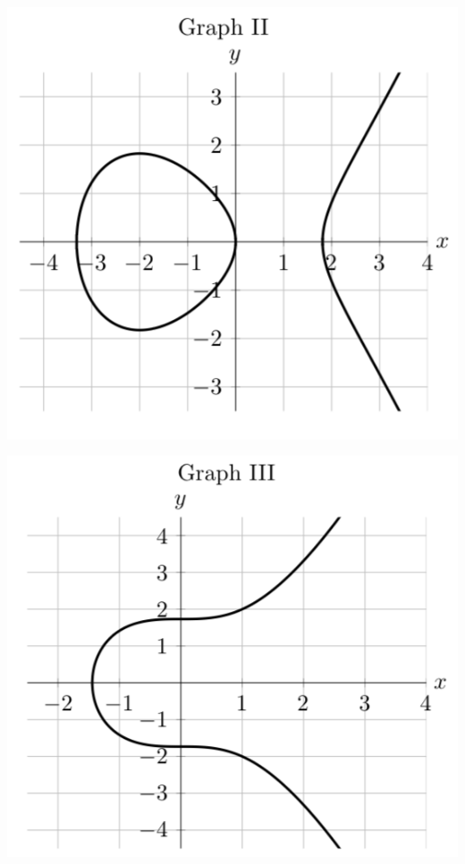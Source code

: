\documentclass[11pt]{exam}
\begin{document}
\begin{questions}
\begin{multicols}{3}
\begin{center}
  \end{center}
  \begin{center}
    \includegraphics[scale=0.3]{Figures/graphII.png}
  \end{center}
  \begin{center}
    \includegraphics[scale=0.3]{Figures/graphIII.png}
  \end{center}

\end{multicols}
\end{questions}
\end{document}
